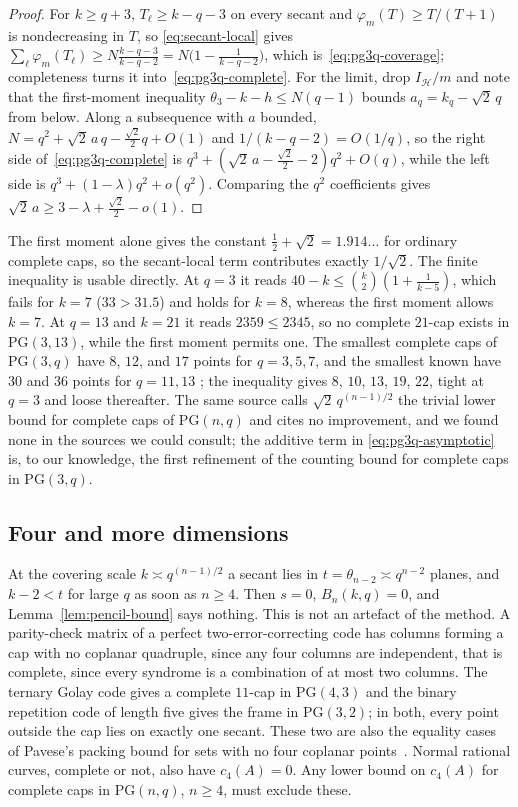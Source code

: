 \documentclass[11pt]{article}
\theoremstyle{definition}
\theoremstyle{remark}
\newcommand{\PG}{\mathrm{PG}}
\newcommand{\cH}{\mathcal{H}}
\newcommand{\IH}{I_{\cH}}
\begin{document}
\begin{proof}
For $k\ge q+3$, $T_\ell\ge k-q-3$ on every secant and
$\varphi_m(T)\ge T/(T+1)$ is nondecreasing in $T$, so
\eqref{eq:secant-local} gives
$\sum_\ell\varphi_m(T_\ell)\ge N\frac{k-q-3}{k-q-2}=N\bigl(1-\frac1{k-q-2}\bigr)$,
which is~\eqref{eq:pg3q-coverage}; completeness turns it
into~\eqref{eq:pg3q-complete}.  For the limit, drop $\IH/m$ and note that
the first-moment inequality $\theta_3-k-h\le N(q-1)$ bounds
$a_q=k_q-\sqrt2\,q$ from below.  Along a subsequence with $a$ bounded,
$N=q^2+\sqrt2\,a\,q-\frac{\sqrt2}2q+O(1)$ and $1/(k-q-2)=O(1/q)$, so
the right side of~\eqref{eq:pg3q-complete} is
$q^3+(\sqrt2\,a-\frac{\sqrt2}2-2)q^2+O(q)$, while the left side is
$q^3+(1-\lambda)q^2+o(q^2)$.  Comparing the $q^2$ coefficients gives
$\sqrt2\,a\ge3-\lambda+\frac{\sqrt2}2-o(1)$.
\end{proof}

The first moment alone gives the constant $\frac12+\sqrt2=1.914\ldots$
for ordinary complete caps, so the secant-local term contributes exactly
$1/\sqrt2$.  The finite inequality is usable directly.  At $q=3$ it reads
$40-k\le\binom{k}{2}(1+\frac1{k-5})$, which fails for $k=7$ ($33>31.5$)
and holds for $k=8$, whereas the first moment allows $k=7$.  At $q=13$
and $k=21$ it reads $2359\le2345$, so no complete $21$-cap exists in
$\PG(3,13)$, while the first moment permits one.  The smallest complete
caps of $\PG(3,q)$ have $8$, $12$, and $17$ points for $q=3,5,7$, and the
smallest known have $30$ and $36$ points for $q=11,13$
\cite{BartoliDavydovKreshchukMarcuginiPambianco2016}; the inequality
gives $8$, $10$, $13$, $19$, $22$, tight at $q=3$ and loose thereafter.
The same source calls $\sqrt2\,q^{(n-1)/2}$ the trivial lower bound for
complete caps of $\PG(n,q)$ and cites no improvement, and we found none
in the sources we could consult; the additive term in
\eqref{eq:pg3q-asymptotic} is, to our knowledge, the first refinement of
the counting bound for complete caps in $\PG(3,q)$.

\subsection{Four and more dimensions}

At the covering scale $k\asymp q^{(n-1)/2}$ a secant lies in
$t=\theta_{n-2}\asymp q^{n-2}$ planes, and $k-2<t$ for large $q$ as soon
as $n\ge4$.  Then $s=0$, $B_n(k,q)=0$, and Lemma~\ref{lem:pencil-bound}
says nothing.  This is not an artefact of the method.  A parity-check
matrix of a perfect two-error-correcting code has columns forming a cap
with no coplanar quadruple, since any four columns are independent, that
is complete, since every syndrome is a combination of at most two columns.
The ternary Golay code gives a complete $11$-cap in $\PG(4,3)$ and the
binary repetition code of length five gives the frame in $\PG(3,2)$; in
both, every point outside the cap lies on exactly one secant.  These two
are also the equality cases of Pavese's packing bound for sets with no four
coplanar points~\cite[Proposition~3.1]{Pavese2023}.  Normal rational
curves, complete or not, also have $c_4(A)=0$.  Any lower bound
on $c_4(A)$ for complete caps in $\PG(n,q)$, $n\ge4$, must exclude these.
\end{document}
